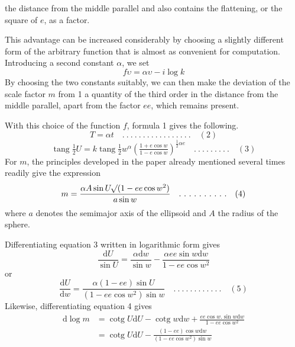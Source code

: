 %
the distance from the middle parallel and also contains the flattening, or the square of \(e\), as a factor.

This advantage can be increased considerably by choosing a slightly different form of the arbitrary function that is almost as convenient for computation. Introducing a second constant \(\alpha\), we set
\[
f\upsilon=\alpha\upsilon-i\log k
\]
By choosing the two constants suitably, we can then make the deviation of the scale factor \(m\) from 1 a quantity of the third order in the distance from the middle parallel, apart from the factor \(ee\), which remains present.

\indent With this choice of the function \(f\), formula 1 gives the following.
\[
T=\alpha t \quad .\ .\ .\ .\ .\ .\ .\ .\ .\ .\ .\ .\ .\ .\ .\ .\ .\quad(2)
\]
\[
\operatorname{tang}\tfrac{1}{2}U=k\operatorname{tang}\tfrac{1}{2}w^\alpha(\tfrac{1+e\cos w}{1-e\cos w})^{\frac{1}{2}\alpha e} \quad .\ .\ .\ .\ .\ .\ .\ .\ .\quad(3)
\]
For \(m\), the principles developed in the paper already mentioned several times readily give the expression
\[
m=\frac{\alpha A\sin U\BareRoot{(1-ee\cos w^2)}}{a\sin w} \quad .\ .\ .\ .\ .\ .\ .\ .\ .\ .\quad(4)
\]
where \(a\) denotes the semimajor axis of the ellipsoid and \(A\) the radius of the sphere.

Differentiating equation 3 written in logarithmic form gives
\[
\frac{\mathrm{d}U}{\sin U}=\frac{\alpha\mathrm{d}w}{\sin w}-\frac{\alpha ee\sin w\mathrm{d}w}{1-ee\cos w^2}
\]
or
\[
\frac{\mathrm{d}U}{\mathrm{d}w}=\frac{\alpha(1-ee)\sin U}{(1-ee\cos w^2)\sin w} \quad .\ .\ .\ .\ .\ .\ .\ .\ .\ .\ .\ .\quad(5)
\]
Likewise, differentiating equation 4 gives
\[
\begin{aligned}
\mathrm{d}\log m&=\operatorname{cotg}U\mathrm{d}U-\operatorname{cotg}w\mathrm{d}w+\frac{ee\cos w\mathord{.}\sin w\mathrm{d}w}{1-ee\cos w^2}\\
&=\operatorname{cotg}U\mathrm{d}U-\frac{(1-ee)\cos w\mathrm{d}w}{(1-ee\cos w^2)\sin w}
\end{aligned}
\]
